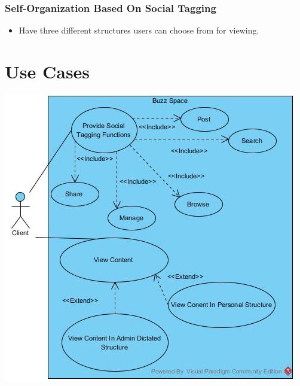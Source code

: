 \documentclass[12pt, oneside]{article}
\begin{document}
\subsubsection{Self-Organization Based On Social Tagging}
\begin{itemize}
\item Have three different structures users can choose from for viewing.
\end{itemize}

\section{Use Cases}
  \includegraphics{u29630135_socialTagging.jpg}
    \rule{0\linewidth}{0.15\linewidth}\par
\end{document}
